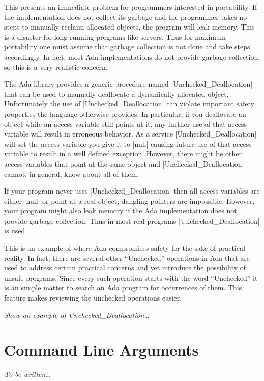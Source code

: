 This presents an immediate problem for programmers interested in portability. If the
implementation does not collect its garbage and the programmer takes no steps to manually
reclaim allocated objects, the program will leak memory. This is a disaster for long running
programs like servers. Thus for maximum portability one must assume that garbage collection is
not done and take steps accordingly. In fact, most Ada implementations do not provide garbage
collection, so this is a very realistic concern.

The Ada library provides a generic procedure named |Unchecked_Deallocation| that can be used to
manually deallocate a dynamically allocated object. Unfortunately the use of
|Unchecked_Deallocation| can violate important safety properties the language otherwise
provides. In particular, if you deallocate an object while an access variable still points at
it, any further use of that access variable will result in erroneous behavior. As a service
|Unchecked_Deallocation| will set the access variable you give it to |null| causing future use
of that access variable to result in a well defined exception. However, there might be other
access variables that point at the same object and |Unchecked_Deallocation| cannot, in general,
know about all of them.

If your program never uses |Unchecked_Deallocation| then all access variables are either |null|
or point at a real object; dangling pointers are impossible. However, your program might also
leak memory if the Ada implementation does not provide garbage collection. Thus in most real
programs |Unchecked_Deallocation| is used.

This is an example of where Ada compromises safety for the sake of practical reality. In fact,
there are several other ``Unchecked'' operations in Ada that are used to address certain
practical concerns and yet introduce the possibility of unsafe programs. Since every such
operation starts with the word ``Unchecked'' it is an simple matter to search an Ada program for
occurrences of them. This feature makes reviewing the unchecked operations easier.

\textit{Show an example of Unchecked\_Deallocation\ldots}

\section{Command Line Arguments}

\textit{To be written\ldots}

